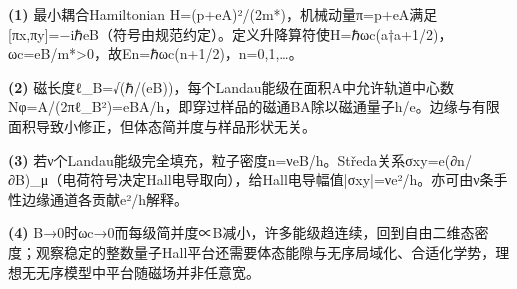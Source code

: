 \par\noindent\textbf{(1)} 最小耦合Hamiltonian H=(p+eA)²/(2m*)，机械动量π=p+eA满足[πx,πy]=−iℏeB（符号由规范约定）。定义升降算符使H=ℏωc(a†a+1/2)，ωc=eB/m*>0，故En=ℏωc(n+1/2)，n=0,1,…。
\par\noindent\textbf{(2)} 磁长度ℓ\_B=√(ℏ/(eB))，每个Landau能级在面积A中允许轨道中心数Nφ=A/(2πℓ\_B²)=eBA/h，即穿过样品的磁通BA除以磁通量子h/e。边缘与有限面积导致小修正，但体态简并度与样品形状无关。
\par\noindent\textbf{(3)} 若ν个Landau能级完全填充，粒子密度n=νeB/h。Středa关系σxy=e(∂n/∂B)\_μ（电荷符号决定Hall电导取向），给Hall电导幅值|σxy|=νe²/h。亦可由ν条手性边缘通道各贡献e²/h解释。
\par\noindent\textbf{(4)} B→0时ωc→0而每级简并度∝B减小，许多能级趋连续，回到自由二维态密度；观察稳定的整数量子Hall平台还需要体态能隙与无序局域化、合适化学势，理想无无序模型中平台随磁场并非任意宽。
